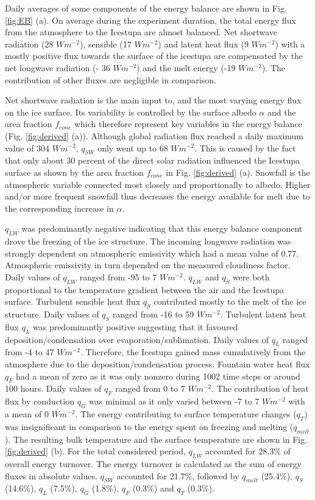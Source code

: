 \documentclass[utf8]{frontiersSCNS} %
\begin{document}
Daily averages of some components of the energy balance are shown in Fig.
\ref{fig:EB} (a). On average during the experiment duration, the total energy
flux from the atmosphere to the Icestupa are almost balanced. Net shortwave
radiation (28 $Wm^{-2}$), sensible (17 $Wm^{-2}$) and latent heat flux (9
$Wm^{-2}$) with a mostly positive flux towards the surface of the icestupa are
compensated by the net longwave radiation (- 36 $Wm^{-2}$) and the melt energy
(-19 $Wm^{-2}$). The contribution of other fluxes are negligible in
comparison.

Net shortwave radiation is the main input to, and the most varying energy flux
on the ice surface. Its variability is controlled by the surface albedo
$\alpha$ and the area fraction $f_{cone}$ which therefore represent key
variables in the energy balance (Fig. \ref{fig:derived} (a)). Although global
radiation flux reached a daily maximum value of 304 $Wm^{-2}$, $q_{SW}$ only
went up to 68 $Wm^{-2}$. This is caused by the fact that only about 30 percent
of the direct solar radiation influenced the Icestupa surface as shown by the
area fraction $f_{cone}$ in Fig. \ref{fig:derived} (a). Snowfall is the
atmospheric variable connected most closely and proportionally to albedo.
Higher and/or more frequent snowfall thus decreases the energy available for
melt due to the corresponding increase in $\alpha$. 

$q_{LW}$ was predominantly negative indicating that this energy balance
component drove the freezing of the ice structure. The incoming longwave
radiation was strongly dependent on atmospheric emissivity which had a mean
value of 0.77. Atmospheric emissivity in turn depended on the measured
cloudiness factor. Daily values of $q_{LW}$ ranged from -95 to 7 $Wm^{-2}$.
$q_{LW}$ and $q_{S}$ were both proportional to the temperature gradient
between the air and the Icestupa surface. Turbulent sensible heat flux $q_{S}$
contributed mostly to the melt of the ice structure. Daily values of $q_{S}$
ranged from -16 to 59 $Wm^{-2}$. Turbulent latent heat flux $q_{L}$ was
predominantly positive suggesting that it favoured deposition/condensation
over evaporation/sublimation. Daily values of $q_{L}$ ranged from -4 to 47
$Wm^{-2}$. Therefore, the Icestupa gained mass cumulatively from the
atmosphere due to the deposition/condensation process. Fountain water heat
flux $q_{F}$ had a mean of zero as it was only nonzero during 1002 time steps
or around 100 hours. Daily values of $q_{F}$ ranged from 0 to 7 $Wm^{-2}$. The
contribution of heat flux by conduction $q_{G}$ was minimal as it only varied
between -7 to 7 $Wm^{-2}$ with a mean of 0 $Wm^{-2}$. The energy contributing
to surface temperature changes ($q_{T}$) was insignificant in comparison to
the energy spent on freezing and melting ($q_{melt}$). The resulting bulk
temperature and the surface temperature are shown in Fig. \ref{fig:derived}
(b).  For the total considered period, $q_{LW}$ accounted for 28.3\% of
overall energy turnover. The energy turnover is calculated as the sum of
energy fluxes in absolute values. $q_{SW}$ accounted for 21.7\%, followed by
$q_{melt}$ (25.4\%), $q_{S}$ (14.6\%), $q_{L}$ (7.5\%), $q_{G}$ (1.8\%),
$q_{F}$ (0.3\%) and $q_{T}$ (0.3\%).
\end{document}
